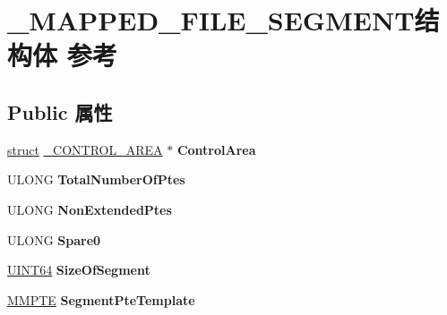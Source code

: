 \hypertarget{struct___m_a_p_p_e_d___f_i_l_e___s_e_g_m_e_n_t}{}\section{\+\_\+\+M\+A\+P\+P\+E\+D\+\_\+\+F\+I\+L\+E\+\_\+\+S\+E\+G\+M\+E\+N\+T结构体 参考}
\label{struct___m_a_p_p_e_d___f_i_l_e___s_e_g_m_e_n_t}
\subsection*{Public 属性}
\begin{DoxyCompactItemize}
\item 
\mbox{\label{struct___m_a_p_p_e_d___f_i_l_e___s_e_g_m_e_n_t_a968a586641763a121315983c9f4b1eba}} 
\hyperlink{interfacestruct}{struct} \hyperlink{struct___c_o_n_t_r_o_l___a_r_e_a}{\+\_\+\+C\+O\+N\+T\+R\+O\+L\+\_\+\+A\+R\+EA} $\ast$ {\bfseries Control\+Area}
\item 
\mbox{\label{struct___m_a_p_p_e_d___f_i_l_e___s_e_g_m_e_n_t_a8c2129f0634a969d6fadabf694e6ac69}} 
U\+L\+O\+NG {\bfseries Total\+Number\+Of\+Ptes}
\item 
\mbox{\label{struct___m_a_p_p_e_d___f_i_l_e___s_e_g_m_e_n_t_a6cba001e9daef65ea256b15763d6160f}} 
U\+L\+O\+NG {\bfseries Non\+Extended\+Ptes}
\item 
\mbox{\label{struct___m_a_p_p_e_d___f_i_l_e___s_e_g_m_e_n_t_abeca11ebd1682bd67e12a166682b0a03}} 
U\+L\+O\+NG {\bfseries Spare0}
\item 
\mbox{\label{struct___m_a_p_p_e_d___f_i_l_e___s_e_g_m_e_n_t_af6bc6435f2b5a386d551af461e5aa722}} 
\hyperlink{_processor_bind_8h_a57be03562867144161c1bfee95ca8f7c}{U\+I\+N\+T64} {\bfseries Size\+Of\+Segment}
\item 
\mbox{\label{struct___m_a_p_p_e_d___f_i_l_e___s_e_g_m_e_n_t_a0c05b81f21b565183e340e964382354d}} 
\hyperlink{struct___m_m_p_t_e}{M\+M\+P\+TE} {\bfseries Segment\+Pte\+Template}

\end{DoxyCompactItemize}
